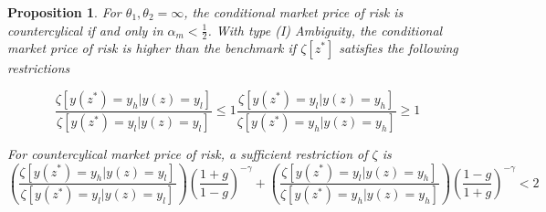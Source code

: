 \documentclass[12pt]{article}
\newtheorem{proposition}{Proposition}
\begin{document}
\begin{proposition}
\label{propo-7}
For $\theta_1,\theta_2=\infty$, the conditional market price of risk is countercylical if and only in $\alpha_m < \frac{1}{2}$. With type (I) Ambiguity, the conditional market price of risk is higher than the benchmark if $\zeta[z^*]$ satisfies the following restrictions

\begin{subequations}
\label{eq:mprgreaterthanbenchmarkcondition}
\begin{equation}
	\frac{\zeta[y(z^*)=y_h|y(z)=y_l]}{\zeta[y(z^*)=y_l|y(z)=y_l]} \leq 1
\end{equation}
\begin{equation}
	\frac{\zeta[y(z^*)=y_l|y(z)=y_h]}{\zeta[y(z^*)=y_h|y(z)=y_h]} \geq 1
\end{equation}
\end{subequations}

For countercylical market price of risk, a sufficient restriction of $\zeta$ is
\begin{equation}
\label{eq:countercylicalmprcondition}
\left(\frac{\zeta[y(z^*)=y_h|y(z)=y_l]}{\zeta[y(z^*)=y_l|y(z)=y_l]}\right)\left(\frac{1+g}{1-g}\right)^{-\gamma}+ \left(\frac{\zeta[y(z^*)=y_l|y(z)=y_h]}{\zeta[y(z^*)=y_h|y(z)=y_h]}\right)\left(\frac{1-g}{1+g}\right)^{-\gamma} <2
\end{equation}
\end{proposition}
\end{document}
